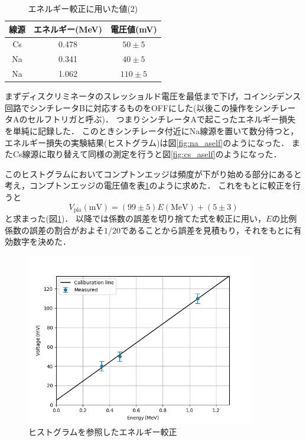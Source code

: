 \documentclass[a4paper,11pt]{jsarticle}
\begin{document}
\begin{table}[htbp]
  \centering
  \caption{エネルギー較正に用いた値(2)}
  \label{tab:calib2}  
  \begin{tabular}{c|cc}
    線源 & エネルギー(MeV) & 電圧値(mV) \\
    \hline\hline
    Cs & 0.478 & $50\pm 5$ \\
    Na & 0.341 & $40\pm 5$ \\
    Na & 1.062 & $110\pm 5$ \\ 
    \hline
  \end{tabular}
\end{table}

まずディスクリミネータのスレッショルド電圧を最低まで下げ，コインシデンス回路でシンチレータBに対応するものをOFFにした(以後この操作をシンチレータAのセルフトリガと呼ぶ)．
つまりシンチレータAで起こったエネルギー損失を単純に記録した．
このときシンチレータ付近にNa線源を置いて数分待つと，エネルギー損失の実験結果(ヒストグラム)は図\ref{fig:na_aself}のようになった．
またCs線源に取り替えて同様の測定を行うと図\ref{fig:cs_aself}のようになった．

このヒストグラムにおいてコンプトンエッジは頻度が下がり始める部分にあると考え，コンプトンエッジの電圧値を表\ref{tab:calib2}のように求めた．
これをもとに較正を行うと
\begin{equation}
  V_{\mathrm{pla}}(\si{\mV}) = (99\pm 5) E(\si{\MeV}) + (5\pm 3)
\end{equation}
と求まった(図\ref{fig:calib2})．
以降では係数の誤差を切り捨てた式を較正に用い，$E$の比例係数の誤差の割合がおよそ$1/20$であることから誤差を見積もり，それをもとに有効数字を決めた．

\begin{figure}[htbp]
  \centering
  \includegraphics[width=10cm]{calib2.png}
  \caption{ヒストグラムを参照したエネルギー較正}
  \label{fig:calib2}
\end{figure}
\end{document}

